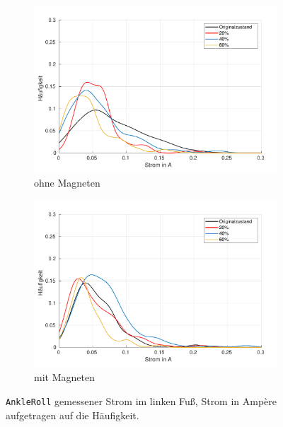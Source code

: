 \begin{figure}[tb]
	\centering
	\begin{subfigure}[c]{.9\linewidth}
		\centering
		\includegraphics[width=\linewidth]{Bilder/links_Current_AnkleRoll_ohneM.pdf}
		\caption{ohne Magneten}
	\end{subfigure}
	\begin{subfigure}[c]{.9\linewidth}
		\centering
		\includegraphics[width=\linewidth]{Bilder/links_Current_AnkleRoll_mitM.pdf}
		\caption{mit Magneten}
	\end{subfigure}
	\caption{\texttt{AnkleRoll} gemessener Strom im linken Fuß, Strom in Ampère aufgetragen auf die Häufigkeit.} \label{AnkleRoll_Current_links}
\end{figure}
